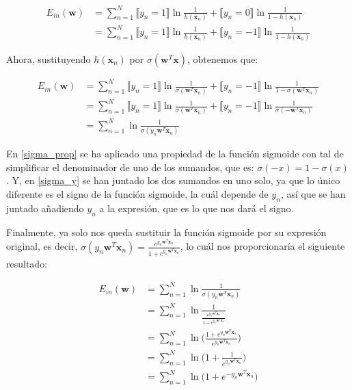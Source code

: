 \documentclass[11pt,a4paper]{article}
\begin{document}
\begin{equation}
\begin{split}
	E_{in}(\mathbf{w}) &= \sum_{n=1}^N  \llbracket y_n = 1 \rrbracket \ln \frac{1}{h(\mathbf{x}_n)} +
	\llbracket y_n = 0 \rrbracket \ln \frac{1}{1 - h(\mathbf{x}_n)} \\
	&= \sum_{n=1}^N  \llbracket y_n = 1 \rrbracket \ln \frac{1}{h(\mathbf{x}_n)} +
	\llbracket y_n = -1 \rrbracket \ln \frac{1}{1 - h(\mathbf{x}_n)}
\end{split}
\end{equation}

Ahora, sustituyendo $h(\mathbf{x}_n)$ por $\sigma (\mathbf{w}^T\mathbf{x})$, obtenemos que:

\begin{align}
	E_{in}(\mathbf{w}) &= \sum_{n=1}^N  \llbracket y_n = 1 \rrbracket \ln \frac{1}{\sigma (\mathbf{w}^T\mathbf{x}_n)} +
	\llbracket y_n = -1 \rrbracket \ln \frac{1}{1 - \sigma (\mathbf{w}^T\mathbf{x}_n)} \\
	&= \sum_{n=1}^N  \llbracket y_n = 1 \rrbracket \ln \frac{1}{\sigma (\mathbf{w}^T\mathbf{x}_n)} +
	\llbracket y_n = -1 \rrbracket \ln \frac{1}{\sigma (-\mathbf{w}^T\mathbf{x}_n)} \label{sigma_prop} \\
	&= \sum_{n=1}^N  \ln \frac{1}{\sigma (y_n \mathbf{w}^T\mathbf{x}_n)} \label{sigma_y}
\end{align}

En \eqref{sigma_prop} se ha aplicado una propiedad de la función sigmoide con tal de simplificar el denominador de uno de
los sumandos, que es: $\sigma (-x) = 1 - \sigma (x)$. Y, en \eqref{sigma_y} se han juntado los dos sumandos en uno solo, ya
que lo único diferente es el signo de la función sigmoide, la cuál depende de $y_n$, así que se han juntado añadiendo $y_n$
a la expresión, que es lo que nos dará el signo.

Finalmente, ya solo nos queda sustituir la función sigmoide por su expresión original, es decir,
$\sigma (y_n \mathbf{w}^T\mathbf{x}_n) = \frac{e^{y_n \mathbf{w}^T\mathbf{x}_n}}{1 + e^{y_n \mathbf{w}^T\mathbf{x}_n}}$, lo
cuál nos proporcionaría el siguiente resultado:

\begin{equation}
\begin{split}
	E_{in}(\mathbf{w}) &= \sum_{n=1}^N \ln \frac{1}{\sigma (y_n \mathbf{w}^T\mathbf{x}_n)} \\
	&= \sum_{n=1}^N \ln \frac{1}{\frac{e^{y_n \mathbf{w}^T\mathbf{x}_n}}{1 + e^{y_n \mathbf{w}^T\mathbf{x}_n}}} \\
	&= \sum_{n=1}^N \ln \bigg( \frac{1 + e^{y_n \mathbf{w}^T\mathbf{x}_n}}{e^{y_n \mathbf{w}^T\mathbf{x}_n}} \bigg) \\
	&= \sum_{n=1}^N \ln \bigg(1 + \frac{1}{e^{y_n \mathbf{w}^T\mathbf{x}_n}} \bigg) \\
	&= \sum_{n=1}^N \ln \Big(1 + e^{-y_n \mathbf{w}^T\mathbf{x}_n} \Big) \\
\end{split}
\end{equation}
\end{document}
